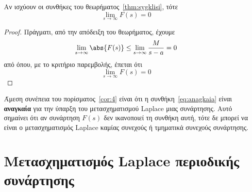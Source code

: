 \begin{cor}\label{cor:4}
  Αν ισχύουν οι συνθήκες του θεωρήματος~\ref{thm:sygklisi}, τότε
  \begin{equation}\label{eq:anagkaia}
    \lim_{s \to \infty} F(s) = 0 
  \end{equation} 
\end{cor}
\begin{proof}
  Πράγματι, από την απόδειξη του θεωρήματος, έχουμε
  \[
    \lim_{s \to \infty} \abs{F(s)} \leq \lim_{s \to \infty} \frac{M}{s-a} = 0
  \] 
  από όπου, με το κριτήριο παρεμβολής, έπεται ότι
  \[
    \lim_{s \to \infty} F(s) = 0 
  \]
\end{proof}
\begin{rem}
  Άμεση συνέπεια του πορίσματος~\ref{cor:4} είναι ότι η συνθήκη~\eqref{eq:anagkaia} 
  είναι \textbf{αναγκαία} για την ύπαρξη του μετασχηματισμού Laplace μιας συνάρτησης. 
  Αυτό σημαίνει ότι αν συνάρτηση $F(s)$ δεν ικανοποιεί τη συνθήκη αυτή, τότε δε 
  μπορεί να είναι ο μετασχηματισμός Laplace καμίας συνεχούς ή τμηματικά συνεχούς 
  συνάρτησης.
\end{rem}

\section*{Μετασχηματισμός Laplace περιοδικής συνάρτησης}

